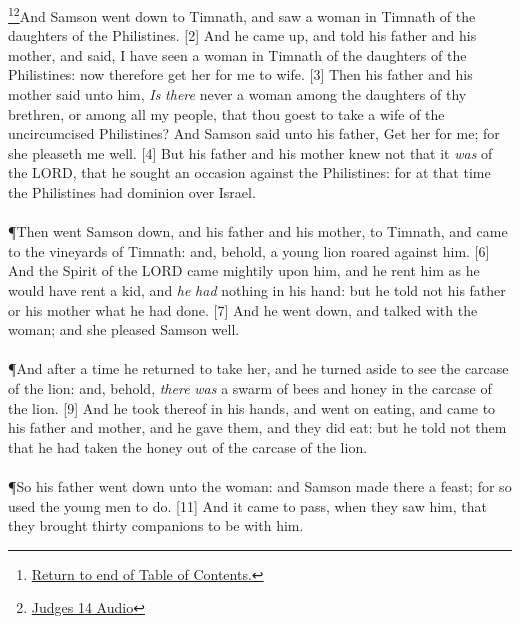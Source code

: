 \footnote{\textcolor[rgb]{0.00,0.25,0.00}{\hyperlink{JudgesTOC}{Return to end of Table of Contents.}}}\footnote{\href{https://audiobible.com/bible/judges_14.html}{\textcolor[cmyk]{0.99998,1,0,0}{Judges 14 Audio}}}\textcolor[cmyk]{0.99998,1,0,0}{And Samson went down to Timnath, and saw a woman in Timnath of the daughters of the Philistines.}
[2] \textcolor[cmyk]{0.99998,1,0,0}{And he came up, and told his father and his mother, and said, I have seen a woman in Timnath of the daughters of the Philistines: now therefore get her for me to wife.}
[3] \textcolor[cmyk]{0.99998,1,0,0}{Then his father and his mother said unto him, \emph{Is} \emph{there} never a woman among the daughters of thy brethren, or among all my people, that thou goest to take a wife of the uncircumcised Philistines? And Samson said unto his father, Get her for me; for she pleaseth me well.}
[4] \textcolor[cmyk]{0.99998,1,0,0}{But his father and his mother knew not that it \emph{was} of the LORD, that he sought an occasion against the Philistines: for at that time the Philistines had dominion over Israel.}\\
\\
\P \textcolor[cmyk]{0.99998,1,0,0}{Then went Samson down, and his father and his mother, to Timnath, and came to the vineyards of Timnath: and, behold, a young lion roared against him.}
[6] \textcolor[cmyk]{0.99998,1,0,0}{And the Spirit of the LORD came mightily upon him, and he rent him as he would have rent a kid, and \emph{he} \emph{had} nothing in his hand: but he told not his father or his mother what he had done.}
[7] \textcolor[cmyk]{0.99998,1,0,0}{And he went down, and talked with the woman; and she pleased Samson well.}\\
\\
\P \textcolor[cmyk]{0.99998,1,0,0}{And after a time he returned to take her, and he turned aside to see the carcase of the lion: and, behold, \emph{there} \emph{was} a swarm of bees and honey in the carcase of the lion.}
[9] \textcolor[cmyk]{0.99998,1,0,0}{And he took thereof in his hands, and went on eating, and came to his father and mother, and he gave them, and they did eat: but he told not them that he had taken the honey out of the carcase of the lion.}\\
\\
\P \textcolor[cmyk]{0.99998,1,0,0}{So his father went down unto the woman: and Samson made there a feast; for so used the young men to do.}
[11] \textcolor[cmyk]{0.99998,1,0,0}{And it came to pass, when they saw him, that they brought thirty companions to be with him.}\\
